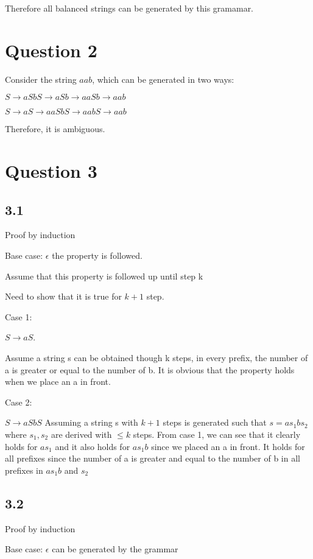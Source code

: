 \documentclass[a4paper, 11pt]{article}
\begin{document}
Therefore all balanced strings can be generated by this gramamar.

\section*{Question 2}
 
Consider the string $aab$, which can be generated in two ways:

$S \rightarrow aSbS \rightarrow aSb \rightarrow aaSb \rightarrow aab$

$S \rightarrow aS \rightarrow aaSbS \rightarrow aabS \rightarrow aab$

Therefore, it is ambiguous.

\section*{Question 3}
\subsection*{3.1}
Proof by induction

Base case: $\epsilon$ the property is followed.

Assume that this property is followed up until step k

Need to show that it is true for $k+1$ step.

Case 1:

$S \rightarrow aS$. 

Assume a string s can be obtained though k steps, in every prefix, the number of a is greater or equal to the number of b. It is obvious that the property holds when we place an a in front.

Case 2:

$S \rightarrow aSbS$ Assuming a string s with $k+1$ steps is generated such that $s=as_1bs_2$ where $s_1,s_2$ are derived with $\leq k$ steps. From case 1, we can see that it clearly holds for $as_1$ and it also holds for $as_1b$ since we placed an a in front. It holds for all prefixes since the number of a is greater and equal to the number of b in all prefixes in $as_1b$ and $s_2$

\subsection*{3.2}

Proof by induction

Base case: $\epsilon$ can be generated by the grammar
\end{document}
